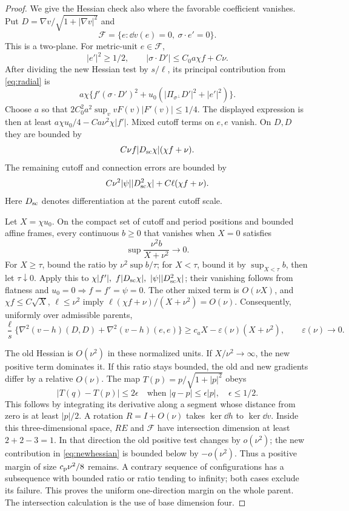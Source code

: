 \begin{proof}
We give the Hessian check also where the favorable coefficient
vanishes. Put \(D=\nabla v/\sqrt{1+|\nabla v|^2}\) and
\[
 \mathcal F=\{e:\dd v(e)=0,\ \sigma\cdot e'=0\}.
\]
This is a two-plane. For metric-unit \(e\in\mathcal F\),
\[
 |e'|^2\ge1/2,\qquad |\sigma\cdot D'|\le C_0a\chi f+C\nu.
\]
After dividing the new Hessian test by \(s/\ell\), its principal
contribution from \eqref{eq:radial} is
\[
 a\chi\{f'(\sigma\cdot D')^2+
            u_0(|\Pi_{\sigma^\perp}D'|^2+|e'|^2)\}.
\]
Choose \(a\) so that
\(2C_0^2a^2\sup_v vF(v)|F'(v)|\le1/4\).
The displayed expression is then at least
\(a\chi u_0/4-Ca\nu^2\chi|f'|\).
Mixed cutoff terms on \(e,e\) vanish. On \(D,D\) they are bounded by
\[
 C\nu f|D_{\rm sc}\chi|(\chi f+\nu).
\]
The remaining cutoff and connection errors are bounded by
\[
 C\nu^2|\psi||D_{\rm sc}^2\chi|
       +C\ell(\chi f+\nu).
\]
Here \(D_{\rm sc}\) denotes differentiation at the parent cutoff scale.

Let \(X=\chi u_0\). On the compact set of cutoff and period positions
and bounded affine frames, every continuous \(b\ge0\) that vanishes
when \(X=0\) satisfies
\[
 \sup\frac{\nu^2b}{X+\nu^2}\longrightarrow0.
\]
For \(X\ge\tau\), bound the ratio by \(\nu^2\sup b/\tau\);
for \(X<\tau\), bound it by \(\sup_{X<\tau}b\), then let
\(\tau\downarrow0\). Apply this to
\(\chi|f'|,\ f|D_{\rm sc}\chi|,\ |\psi||D_{\rm sc}^2\chi|\);
their vanishing follows from flatness and \(u_0=0\Rightarrow f=f'=\psi=0\).
The other mixed term is \(O(\nu X)\), and
\(\chi f\le C\sqrt X\), \(\ell\le\nu^2\) imply
\(\ell(\chi f+\nu)/(X+\nu^2)=O(\nu)\).
Consequently, uniformly over admissible parents,
\begin{equation}\label{eq:newhessian}
 \frac{\ell}{s}\{\nabla^2(v-h)(D,D)+\nabla^2(v-h)(e,e)\}
 \ge c_aX-\varepsilon(\nu)(X+\nu^2),\qquad
 \varepsilon(\nu)\to0.
\end{equation}

The old Hessian is \(O(\nu^2)\) in these normalized units.
If \(X/\nu^2\to\infty\), the new positive term dominates it.
If this ratio stays bounded, the old and new gradients differ by a
relative \(O(\nu)\). The map \(T(p)=p/\sqrt{1+|p|^2}\) obeys
\[
 |T(q)-T(p)|\le2\epsilon
 \quad\text{when }|q-p|\le\epsilon|p|,\quad\epsilon\le1/2.
\]
This follows by integrating its derivative along a segment whose
distance from zero is at least \(|p|/2\). A rotation \(R=I+O(\nu)\)
takes \(\ker\dd h\) to \(\ker\dd v\). Inside this three-dimensional
space, \(RE\) and \(\mathcal F\) have intersection dimension at least
\(2+2-3=1\). In that direction the old positive test changes by
\(o(\nu^2)\); the new contribution in \eqref{eq:newhessian} is
bounded below by \(-o(\nu^2)\). Thus a positive margin of size
\(c_{\rm p}\nu^2/8\) remains. A contrary sequence of configurations
has a subsequence with bounded ratio or ratio tending to infinity;
both cases exclude its failure. This proves the uniform one-direction
margin on the whole parent. The intersection calculation is the use
of base dimension four.


\end{proof}
